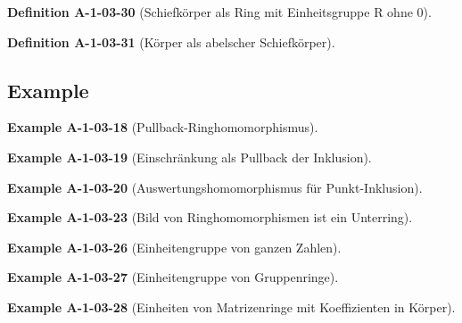 \documentclass[10pt, letterpaper]{article}
\newcommand{\CustomHeading}[3]{%
  \par\medskip\noindent%
  \textbf{#1 #2} \textnormal{(#3)}.\enskip%
}
\newenvironment{DEF}[2]{\CustomHeading{Definition}{#1}{#2}}{}
\newenvironment{EXA}[2]{\CustomHeading{Example}{#1}{#2}}{}
\begin{document}
\begin{DEF}{A-1-03-30}{Schiefkörper als Ring mit Einheitsgruppe R ohne $0$}

\end{DEF}

\begin{DEF}{A-1-03-31}{Körper als abelscher Schiefkörper}

\end{DEF}

















\subsection{Example}

\begin{EXA}{A-1-03-18}{Pullback-Ringhomomorphismus}

\end{EXA}

\begin{EXA}{A-1-03-19}{Einschränkung als Pullback der Inklusion}

\end{EXA}

\begin{EXA}{A-1-03-20}{Auswertungshomomorphismus für Punkt-Inklusion}

\end{EXA}

\begin{EXA}{A-1-03-23}{Bild von Ringhomomorphismen ist ein Unterring}

\end{EXA}

\begin{EXA}{A-1-03-26}{Einheitengruppe von ganzen Zahlen}

\end{EXA}

\begin{EXA}{A-1-03-27}{Einheitengruppe von Gruppenringe}

\end{EXA}

\begin{EXA}{A-1-03-28}{Einheiten von Matrizenringe mit Koeffizienten in Körper}

\end{EXA}
\end{document}
